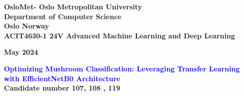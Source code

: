 \documentclass[12pt, a4paper, oneside, openright]{book}
\begin{document}

\begin{titlepage}
\begin{center}
\textbf{\LARGE OsloMet- Oslo Metropolitan University}\\[0.5cm] 
\textbf{\Large Department of Computer Science}\\[0.2cm]
\textbf{\Large Oslo Norway }\\[0.8cm]
\textbf{\Large ACIT4630-1 24V Advanced Machine Learning and Deep Learning}\\[0.2cm]
\vspace{20pt}


\begin{center}
\textbf{May 2024}\\
\end{center}
\vspace{20pt}

\par
\vspace{20pt}
\textbf{\Large \textcolor{blue}{Optimizing Mushroom Classification: Leveraging Transfer Learning with EfficientNetB0 Architecture}}\\
\vspace{25pt}
\vspace{1pt}
\textbf{{ Candidate number 107, 108 , 119 }}\\[0.1cm]
\vspace{25pt}


\end{center}

\par
\vfill
\end{titlepage}


\newpage
\tableofcontents









\appendix






% 

\let\section\chapter






\end{document}
